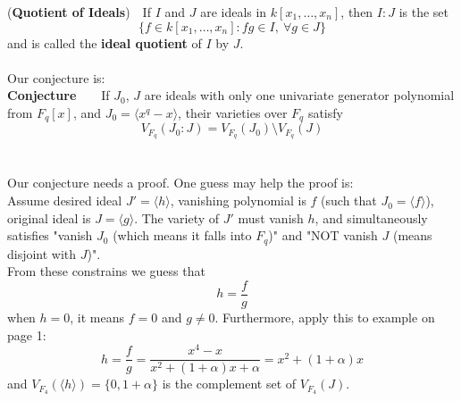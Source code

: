 \documentclass[12pt]{article}
\begin{document}
({\bf Quotient of Ideals})\ \ If $I$ and $J$ are ideals in $k[x_1, \dots, x_n]$, then $I:J$
is the set
  \[
  \{f \in k[x_1, \dots, x_n] : fg \in I,\ \forall g \in J\}
  \]
and is called the {\bf ideal quotient} of $I$ by $J$.\\
\hspace{9mm}\\
Our conjecture is:\\
\textbf{Conjecture}\ \ \ \ If $J_0$, $J$ are ideals with only one univariate generator polynomial from $F_q[x]$, 
and $J_0 = \langle x^q -x \rangle$, their varieties over $F_q$ satisfy $$V_{F_q}(J_0:J) = V_{F_q}(J_0) \setminus V_{F_q}(J)$$\\
\hspace{9mm}\\
Our conjecture needs a proof. One guess may help the proof is:\\
Assume desired ideal $J' = \langle h\rangle$, vanishing polynomial is $f$ (such that $J_0 = \langle f\rangle$),
original ideal is $J = \langle g\rangle$. The variety of $J'$ must vanish $h$,
and simultaneously satisfies "vanish $J_0$ (which means it falls into $F_q$)" and "NOT vanish $J$ (means disjoint with $J$)".
\\
From these constrains we guess that
$$h = \frac{f}{g}$$
when $h=0$, it means $f=0$ and $g\neq 0$. Furthermore, apply this to example on page 1:
$$h = \frac{f}{g} = \frac{x^4-x}{x^2+(1+\alpha)x+\alpha} = x^2+(1+\alpha)x$$
and $V_{F_4}(\langle h\rangle) = \{0,1+\alpha\}$ is the complement set of $V_{F_4}(J)$.
\end{document}

